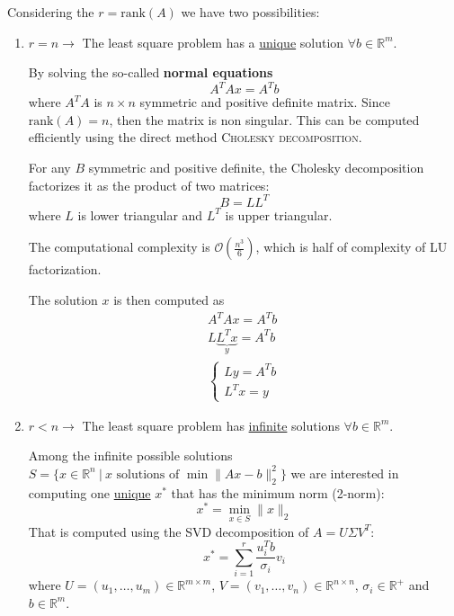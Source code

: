 \documentclass{article}
\begin{document}
Considering the $r=\text{rank}(A)$ we have two possibilities:
\begin{enumerate}
    \item $r=n\to$ The least square problem has a \underline{unique} solution $\forall b\in
        \mathbb{R}^m$.

        By solving the so-called \textbf{normal equations}
        $$A^TAx=A^Tb$$
        where $A^TA$ is $n\times n$ symmetric and positive definite matrix.
        Since $\text{rank}(A)=n$, then the matrix is non singular. This can be
        computed efficiently using the direct method \textsc{Cholesky
        decomposition}.

        For any $B$ symmetric and positive definite, the Cholesky decomposition
        factorizes it as the product of two matrices:
        $$B=LL^T$$
        where $L$ is lower triangular and $L^T$ is upper triangular.

        The computational complexity is $\mathcal{O}(\frac{n^3}{6})$, which is
        half of complexity of LU factorization.

        The solution $x$ is then computed as
        $$
        \begin{aligned}
            A^TAx=A^Tb\\
            L\underbrace{L^Tx}_{y}=A^Tb\\
            \begin{cases}
                Ly=A^Tb \\ 
                L^Tx=y
            \end{cases}
        \end{aligned}
        $$
    \item $r<n\to$ The least square problem has \underline{infinite} solutions $\forall
        b\in \mathbb{R}^m$.

        Among the infinite possible solutions $S=\{x\in\mathbb{R}^n\ |\
        x\text{ solutions of } \min\lVert Ax-b\rVert_2^2\}$ we are interested
        in  computing one \underline{unique} $x^*$ that has the minimum norm
        (2-norm): 
        $$x^*=\min_{x\in S}\lVert x \rVert_2$$
        That is computed using the SVD decomposition of $A=U\Sigma V^T$:
        $$x^*=\sum_{i=1}^r\frac{u_i^Tb}{\sigma_i}v_i$$
        where $U=(u_1,\ldots,u_m)\in\mathbb{R}^{m\times m}$,
        $V=(v_1,\ldots,v_n)\in\mathbb{R}^{n\times n}$, $\sigma_i\in\mathbb{R}^+$ and
        $b\in\mathbb{R}^m$.
\end{enumerate}
\end{document}
